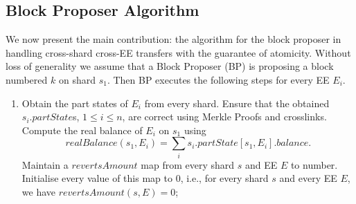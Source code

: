 \documentclass{article}
\begin{document}
\subsection{Block Proposer Algorithm}
We now present the main contribution: the algorithm for the block proposer in handling cross-shard cross-EE transfers with the guarantee of atomicity. Without loss of generality we assume that a Block Proposer (BP) is proposing a block numbered $k$ on shard $s_1$. Then BP executes the following steps for every EE $E_i$. 

\begin{enumerate}
\item Obtain the part states of $E_i$ from every shard. Ensure that the obtained $s_i.partState$s,  $1 \le i \le n$, are correct using Merkle Proofs and crosslinks.
Compute the real balance of $E_i$ on $s_1$ using 
\[
	realBalance(s_1,E_i) = \sum_i s_i.partState[s_1,E_i].balance.
\]
Maintain a $revertsAmount$ map from every shard $s$ and EE $E$ to number.  Initialise every value of this map to $0$, i.e., for every shard $s$ and every EE $E$, we have $revertsAmount(s,E) = 0$;  


\end{enumerate}
\end{document}
